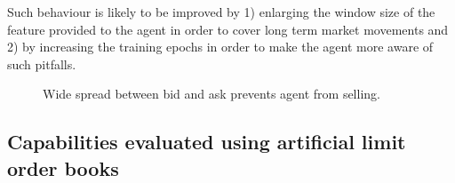 Such behaviour is likely to be improved by 1) enlarging the window size of the feature provided to the agent in order to cover long term market movements and 2) by increasing the training epochs in order to make the agent more aware of such pitfalls.
\begin{figure}[H]
    \centering
    \caption{Wide spread between bid and ask prevents agent from selling.}
    \label{fig:analysis-limit-impatient}
\end{figure}

\subsection{Capabilities evaluated using artificial limit order books}


